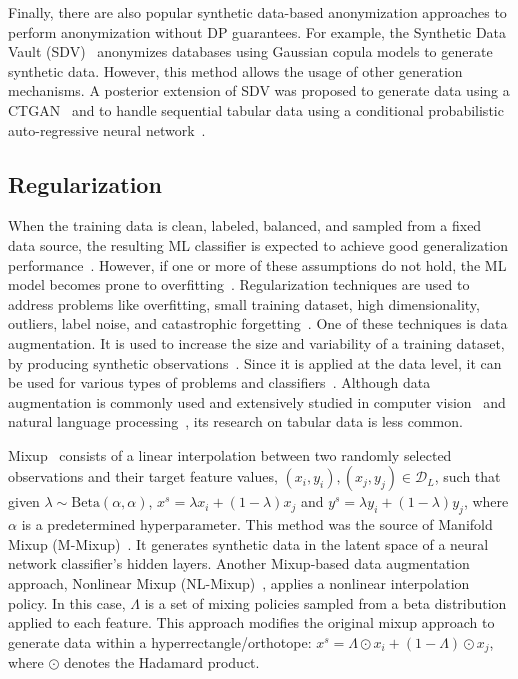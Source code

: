 Finally, there are also popular synthetic data-based anonymization approaches to
perform anonymization without DP guarantees. For example, the Synthetic Data
Vault (SDV)~\cite{patki2016synthetic} anonymizes databases using Gaussian
copula models to generate synthetic data. However, this method allows the
usage of other generation mechanisms. A posterior extension of SDV was
proposed to generate data using a CTGAN~\cite{xu2019modeling} and to handle
sequential tabular data using a conditional probabilistic auto-regressive
neural network~\cite{zhang2022sequential}. 


\subsection{Regularization}\label{sec:regularization}

When the training data is clean, labeled, balanced, and sampled from a fixed
data source, the resulting ML classifier is expected to achieve good
generalization performance~\cite{benning2018modern}. However, if one or more
of these assumptions do not hold, the ML model becomes prone to
overfitting~\cite{Bartlett2021}. Regularization techniques are used to
address problems like overfitting, small training dataset, high
dimensionality, outliers, label noise, and catastrophic
forgetting~\cite{Halevy2009, Domingos2012, Salman2019, Xie2021}. One of
these techniques is data augmentation.
It is used to increase the size and variability of a training dataset, by
producing synthetic observations~\cite{Van2001, Wong2016}. Since it is applied
at the data level, it can be used for various types of problems and
classifiers~\cite{Behpour2019}. Although data
augmentation is commonly used and extensively studied in computer
vision~\cite{Shorten2019} and natural language
processing~\cite{feng2021survey}, its research on tabular data is less common.

Mixup~\cite{zhang2018mixup} consists of a linear interpolation between two
randomly selected observations and their target feature values, $(x_i, y_i),
(x_j, y_j) \in \mathcal{D}_L$, such that given $\lambda \sim
\text{Beta}(\alpha,\alpha)$, $x^s = \lambda x_i + (1-\lambda) x_j$ and $y^s =
\lambda y_i + (1-\lambda) y_j$, where $\alpha$ is a predetermined
hyperparameter. This method was the source of Manifold Mixup
(M-Mixup)~\cite{verma2019manifold}. It generates synthetic data in the latent
space of a neural network classifier's hidden layers. Another Mixup-based
data augmentation approach, Nonlinear Mixup
(NL-Mixup)~\cite{guo2020nonlinear}, applies a nonlinear interpolation policy.
In this case, $\Lambda$ is a set of mixing policies sampled from a beta
distribution applied to each feature. This approach modifies the original
mixup approach to generate data within a hyperrectangle/orthotope: $x^s =
\Lambda \odot x_i + (1-\Lambda) \odot x_j$, where $\odot$ denotes the Hadamard
product.

